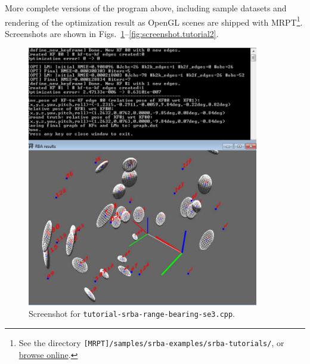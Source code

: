 \documentclass[a4paper,11pt]{article}
\begin{document}
More complete versions of the program above, including sample datasets and rendering of the optimization result 
as OpenGL scenes are shipped with MRPT\footnote{See the directory \texttt{[MRPT]/samples/srba-examples/srba-tutorials/}, 
or \href{http://mrpt.googlecode.com/svn/trunk/samples/srba-examples/srba-tutorials/}{browse online}.}.
Screenshots are shown in Figs.~\ref{fig:screenshot.tutorial1}--\ref{fig:screenshot.tutorial2}.

\begin{figure}[h]
\centering
\includegraphics[width=0.9\textwidth]{imgs/screenshot_tutorial_range-bearing-3D.pdf} 
\caption{Screenshot for \texttt{tutorial-srba-range-bearing-se3.cpp}.}
\label{fig:screenshot.tutorial1}
\end{figure}

\newpage
\end{document}

